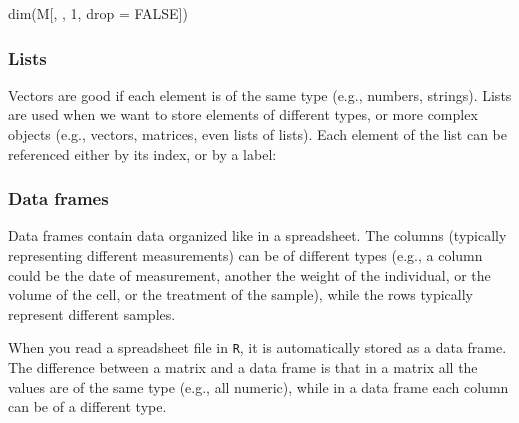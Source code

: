 \documentclass[
  letterpaper,
  DIV=11,
  numbers=noendperiod]{scrreprt}
\newenvironment{Shaded}{\begin{snugshade}}{\end{snugshade}}
\newcommand{\NormalTok}[1]{\textcolor[rgb]{0.00,0.23,0.31}{#1}}
\begin{document}
\begin{Shaded}
\begin{Highlighting}[]
\NormalTok{dim(M[, , 1, drop = FALSE])}
\end{Highlighting}
\end{Shaded}

\subsubsection*{Lists}\label{lists}

Vectors are good if each element is of the same type (e.g., numbers,
strings). Lists are used when we want to store elements of different
types, or more complex objects (e.g., vectors, matrices, even lists of
lists). Each element of the list can be referenced either by its index,
or by a label:

\begin{Shaded}
\end{Shaded}

\subsubsection*{Data frames}\label{data-frames}

Data frames contain data organized like in a spreadsheet. The columns
(typically representing different measurements) can be of different
types (e.g., a column could be the date of measurement, another the
weight of the individual, or the volume of the cell, or the treatment of
the sample), while the rows typically represent different samples.

When you read a spreadsheet file in \texttt{R}, it is automatically
stored as a data frame. The difference between a matrix and a data frame
is that in a matrix all the values are of the same type (e.g., all
numeric), while in a data frame each column can be of a different type.
\end{document}
